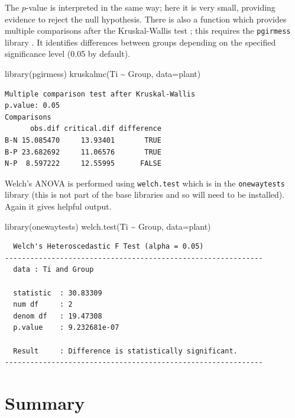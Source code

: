 \documentclass[
  oneside]{krantz}
\newenvironment{Shaded}{\begin{snugshade}}{\end{snugshade}}
\newcommand{\AttributeTok}[1]{\textcolor[rgb]{0.77,0.63,0.00}{#1}}
\newcommand{\FunctionTok}[1]{\textcolor[rgb]{0.00,0.00,0.00}{#1}}
\newcommand{\NormalTok}[1]{#1}
\newcommand{\SpecialCharTok}[1]{\textcolor[rgb]{0.00,0.00,0.00}{#1}}
\begin{document}
The \(p\)-value is interpreted in the same way; here it is very small, providing evidence to reject the null hypothesis. There is also a function which provides multiple comparisons after the Kruskal-Wallis test \citep{Siegel&Castellan1988}; this requires the \texttt{pgirmess} library \citep{R-pgirmess}. It identifies differences between groups depending on the specified significance level (0.05 by default).

\begin{Shaded}
\begin{Highlighting}[]
\FunctionTok{library}\NormalTok{(pgirmess)}
\FunctionTok{kruskalmc}\NormalTok{(Ti }\SpecialCharTok{\textasciitilde{}}\NormalTok{ Group, }\AttributeTok{data=}\NormalTok{plant)}
\end{Highlighting}
\end{Shaded}

\begin{verbatim}
Multiple comparison test after Kruskal-Wallis 
p.value: 0.05 
Comparisons
      obs.dif critical.dif difference
B-N 15.085470     13.93401       TRUE
B-P 23.682692     11.06576       TRUE
N-P  8.597222     12.55995      FALSE
\end{verbatim}

Welch's ANOVA is performed using \texttt{welch.test} which is in the \texttt{onewaytests} library \citep{R-onewaytests} (this is not part of the base libraries and so will need to be installed). Again it gives helpful output.

\begin{Shaded}
\begin{Highlighting}[]
\FunctionTok{library}\NormalTok{(onewaytests)}
\FunctionTok{welch.test}\NormalTok{(Ti }\SpecialCharTok{\textasciitilde{}}\NormalTok{ Group, }\AttributeTok{data=}\NormalTok{plant)}
\end{Highlighting}
\end{Shaded}

\begin{verbatim}
  Welch's Heteroscedastic F Test (alpha = 0.05) 
------------------------------------------------------------- 
  data : Ti and Group 

  statistic  : 30.83309 
  num df     : 2 
  denom df   : 19.47308 
  p.value    : 9.232681e-07 

  Result     : Difference is statistically significant. 
------------------------------------------------------------- 
\end{verbatim}

\hypertarget{SUManova}{%
\section{Summary}\label{SUManova}}
\end{document}

